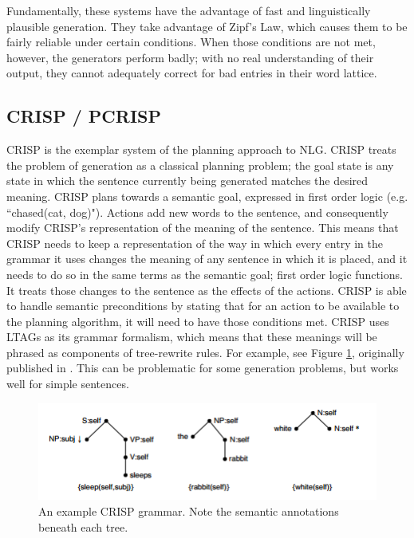 Fundamentally, these systems have the advantage of
fast and linguistically plausible generation.  They
take advantage of Zipf's Law, which causes them
to be fairly reliable under certain conditions.  When
those conditions are not met, however, the generators perform
badly; with no real understanding of their output, they
cannot adequately correct for bad entries in their word
lattice.

\subsection{CRISP / PCRISP}

CRISP is the exemplar system of the planning approach to NLG.
CRISP treats the problem of generation as a classical planning
problem; the goal state is any state in which the sentence
currently being generated matches the desired meaning.
CRISP plans towards a semantic goal,
expressed in first order logic (e.g. ``chased(cat, dog)").
Actions add new words to the sentence, and consequently
modify CRISP's representation of the meaning of the sentence.
This means that CRISP needs to keep a representation of the
way in which every entry in the grammar it uses changes the
meaning of any sentence in which it is placed, and it needs to
do so in the same terms as the semantic goal; first order logic
functions.
It treats those changes to the sentence as the effects of the
actions.  CRISP is able to handle semantic preconditions by
stating that for an action to be available to the planning algorithm,
it will need to have those conditions met.
CRISP uses LTAGs as its grammar formalism,
which means that these meanings will be phrased as components
of tree-rewrite rules.  For example, see Figure \ref{crisp-grammar},
originally published in \cite{koller_experiences_2011}.
This can be problematic for some generation problems, but works well
for simple sentences.

\begin{figure}
\centering
\includegraphics{crisp-grammar.png}
\caption{An example CRISP grammar.  Note the semantic annotations
beneath each tree.}
\label{crisp-grammar}
\end{figure}

